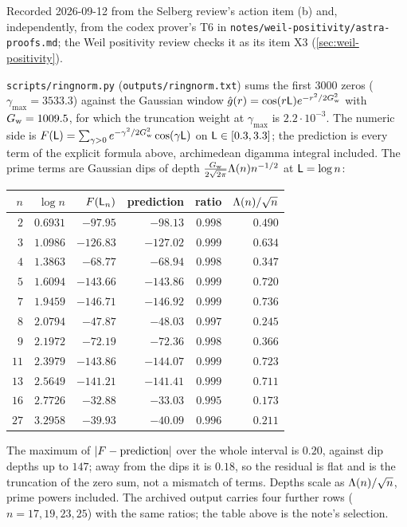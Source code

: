 Recorded 2026-09-12 from the Selberg review's action item (b) and, independently, from
the codex prover's T6 in \texttt{notes/weil-positivity/astra-proofs.md}; the Weil
positivity review checks it as its item X3 (\cref{sec:weil-positivity}).

\begin{numerical}
\label{num:ringnorm-3000}
\texttt{scripts/ringnorm.py} (\texttt{outputs/ringnorm.txt}) sums the first $3000$ zeros
($\gamma_{\max} = 3533.3$) against the Gaussian window $\hat g(r) =
\cos(r\mathsf L)e^{-r^2/2G_{\mathrm w}^2}$ with $G_{\mathrm w} = 1009.5$, for which the truncation weight
at $\gamma_{\max}$ is $2.2\cdot10^{-3}$. The numeric side is $F(\mathsf L) =
\sum_{\gamma>0}e^{-\gamma^2/2G_{\mathrm w}^2}\cos(\gamma \mathsf L)$ on $\mathsf L\in[0.3,3.3]$; the
prediction is every term of the explicit formula above, archimedean digamma integral
included. The prime terms are Gaussian dips of depth
$\frac{G_{\mathrm w}}{2\sqrt{2\pi}}\Lambda(n)n^{-1/2}$ at $\mathsf L = \log n$:
\begin{center}
\begin{tabular}{rrrrrr}
\toprule
$n$ & $\log n$ & $F(\mathsf L_n)$ & prediction & ratio & $\Lambda(n)/\sqrt n$ \\
\midrule
$2$  & $0.6931$ & $-97.95$  & $-98.13$  & $0.998$ & $0.490$ \\
$3$  & $1.0986$ & $-126.83$ & $-127.02$ & $0.999$ & $0.634$ \\
$4$  & $1.3863$ & $-68.77$  & $-68.94$  & $0.998$ & $0.347$ \\
$5$  & $1.6094$ & $-143.66$ & $-143.86$ & $0.999$ & $0.720$ \\
$7$  & $1.9459$ & $-146.71$ & $-146.92$ & $0.999$ & $0.736$ \\
$8$  & $2.0794$ & $-47.87$  & $-48.03$  & $0.997$ & $0.245$ \\
$9$  & $2.1972$ & $-72.19$  & $-72.36$  & $0.998$ & $0.366$ \\
$11$ & $2.3979$ & $-143.86$ & $-144.07$ & $0.999$ & $0.723$ \\
$13$ & $2.5649$ & $-141.21$ & $-141.41$ & $0.999$ & $0.711$ \\
$16$ & $2.7726$ & $-32.88$  & $-33.03$  & $0.995$ & $0.173$ \\
$27$ & $3.2958$ & $-39.93$  & $-40.09$  & $0.996$ & $0.211$ \\
\bottomrule
\end{tabular}
\end{center}
The maximum of $|F - \text{prediction}|$ over the whole interval is $0.20$, against
dip depths up to $147$; away from the dips it is $0.18$, so the residual is flat and is
the truncation of the zero sum, not a mismatch of terms. Depths scale as $\Lambda(n)/\sqrt n$,
prime powers included. The archived output carries four further rows ($n = 17,19,23,25$)
with the same ratios; the table above is the note's selection.
\end{numerical}

